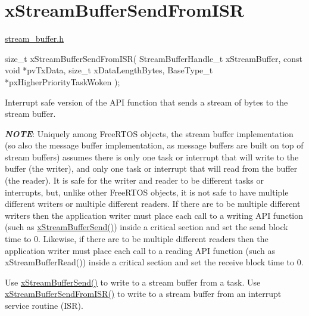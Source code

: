 \hypertarget{group__x_stream_buffer_send_from_i_s_r}{}\section{x\+Stream\+Buffer\+Send\+From\+I\+SR}
\label{group__x_stream_buffer_send_from_i_s_r}
\mbox{\hyperlink{stream__buffer_8h}{stream\+\_\+buffer.\+h}}


\begin{DoxyPre}
size\_t xStreamBufferSendFromISR( StreamBufferHandle\_t xStreamBuffer,
                                 const void *pvTxData,
                                 size\_t xDataLengthBytes,
                                 BaseType\_t *pxHigherPriorityTaskWoken );
\end{DoxyPre}


Interrupt safe version of the A\+PI function that sends a stream of bytes to the stream buffer.

{\itshape {\bfseries{N\+O\+TE}}}\+: Uniquely among Free\+R\+T\+OS objects, the stream buffer implementation (so also the message buffer implementation, as message buffers are built on top of stream buffers) assumes there is only one task or interrupt that will write to the buffer (the writer), and only one task or interrupt that will read from the buffer (the reader). It is safe for the writer and reader to be different tasks or interrupts, but, unlike other Free\+R\+T\+OS objects, it is not safe to have multiple different writers or multiple different readers. If there are to be multiple different writers then the application writer must place each call to a writing A\+PI function (such as \mbox{\hyperlink{stream__buffer_8h_a35cdf3b6bf677086b9128782f762499d}{x\+Stream\+Buffer\+Send()}}) inside a critical section and set the send block time to 0. Likewise, if there are to be multiple different readers then the application writer must place each call to a reading A\+PI function (such as x\+Stream\+Buffer\+Read()) inside a critical section and set the receive block time to 0.

Use \mbox{\hyperlink{stream__buffer_8h_a35cdf3b6bf677086b9128782f762499d}{x\+Stream\+Buffer\+Send()}} to write to a stream buffer from a task. Use \mbox{\hyperlink{stream__buffer_8h_a1dab226e99230e01e79bc2b5c0605e44}{x\+Stream\+Buffer\+Send\+From\+I\+S\+R()}} to write to a stream buffer from an interrupt service routine (I\+SR).


